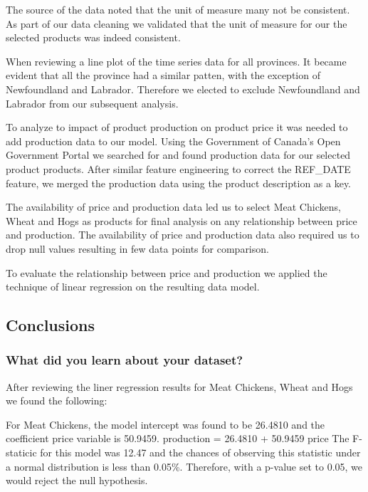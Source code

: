The source of the data noted that the unit of measure many not be consistent. As part of our data cleaning we validated that the unit of measure for our the selected products was indeed consistent. 

When reviewing a line plot of the time series data for all provinces. It became evident that all the province had a similar patten, with the exception of Newfoundland and Labrador. Therefore we elected to exclude Newfoundland and Labrador from our subsequent analysis.

To analyze to impact of product production on product price it was needed to add production data to our model. Using the Government of Canada's Open Government Portal we searched for and found production data for our selected product products. After similar feature engineering to correct the REF\_DATE feature, we merged the production data using the product description as a key.

The availability of price and production data led us to select Meat Chickens, Wheat and Hogs as products for final analysis on any relationship between price and production. The availability of price and production data also required us to drop null values resulting in few data points for comparison.

To evaluate the relationship between price and production we applied the technique of linear regression on the resulting data model.

\subsection{Conclusions}

\subsubsection{What did you learn about your dataset?}

After reviewing the liner regression results for Meat Chickens, Wheat and Hogs we found the following:

For Meat Chickens, the model intercept was found to be 26.4810 and the coefficient price variable is 50.9459. 
\newline
production = 26.4810 + 50.9459 \times price
\newline
The F-staticic for this model was 12.47 and the chances of observing this statistic under a normal distribution is less than 0.05\%. Therefore, with a p-value set to 0.05, we would reject the null hypothesis. 

